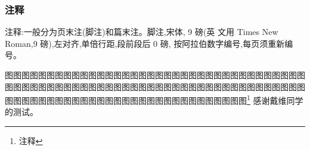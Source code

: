 \documentclass{LZU}
\begin{document}
\subsubsection{注释}
注释:一般分为页末注(脚注)和篇末注。脚注,宋体, 9 磅(英 文用 Times New Roman,9 磅),左对齐,单倍行距,段前段后 0 磅, 按阿拉伯数字编号,每页须重新编号。

\printbibliography[title={参考文献},heading=bibintoc]
\Appendix
图图图图图图图图图图图图图图图图图图图图图图图图图图图图图图图图图图图图图图图图图图图图图图图图图图图图图图图图图图图图图图图图图图图图图图图图图图图图图图图图图图图图图图图图图图图图图图图图图图图图图\footnote{注释}
\Thanks
感谢戴维同学的测试。
\Grade
\end{document}
